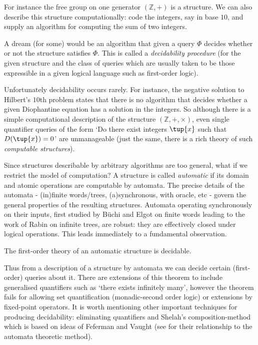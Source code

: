 \documentclass{book}
\begin{document}
For instance the free group on one generator $(\mathbb{Z}, +)$ is a structure.
We can also describe this structure computationally: code the integers, say in
base $10$, and supply an algorithm for computing the sum of two integers.

A dream (for some) would be an algorithm that given a query $\Phi$ decides
whether or not the structure satisfies $\Phi$. This is called a {\em
decidability procedure} (for the given structure and the class of queries which
are usually taken to be those expressible in a given logical language such as
first-order logic).

Unfortunately decidability occurs rarely. For instance, the negative solution
to Hilbert's $10$th problem states that there is no algorithm that decides
whether a given Diophantine equation has a solution in the integers. So
although there is a simple computational description of the structure
$(\mathbb{Z},+,\times)$, even single quantifier queries of the form `Do there
exist integers $\tup{x}$ such that $D(\tup{x}) = 0$' are unmanageable
(just the same, there is a rich theory of such {\em computable structures}).  %

Since structures describable by arbitrary algorithms are too general, what if
we restrict the model of computation?  A structure is called {\em
automatic} if its domain and atomic operations are computable by
automata.  The precise details of the automata  - (in)finite words/trees,
(a)synchronous, with oracle, etc -  govern the general properties of
the resulting structures.  Automata operating synchronously on their inputs,
first studied by B\"uchi and Elgot on finite words leading to the work of Rabin
on infinite trees, are robust: they are effectively closed under logical
operations. This leads immediately to a fundamental observation.
\begin{theorem}
The first-order theory of an automatic structure is decidable.
\end{theorem}

Thus from a description of a structure by automata we can decide certain
(first-order) queries about it. There are extensions of this theorem to include
generalised quantifiers such as `there exists infinitely many', however the
theorem fails for allowing set quantification (monadic-second order logic) or
extensions by fixed-point operators.  It is worth mentioning other important
techniques for producing decidability: eliminating quantifiers \cite{?} and
Shelah's composition-method \cite{?} which is based on ideas of Feferman and
Vaught (see \cite{?} for their relationship to the automata theoretic method).
\end{document}
